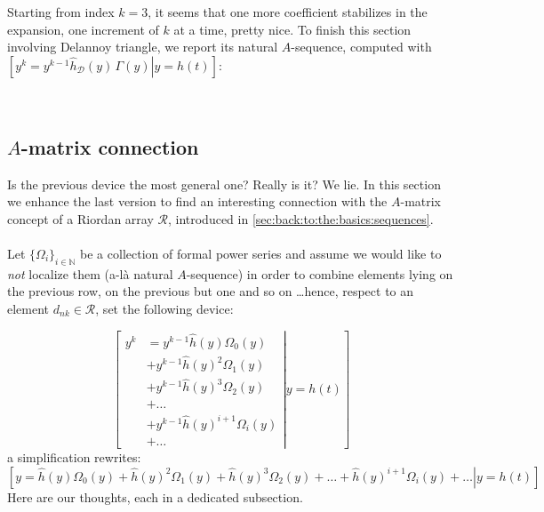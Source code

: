 {    Starting from index $k=3$, it seems that one more coefficient stabilizes
    in the expansion, one increment of $k$ at a time, pretty nice.
    To finish this section involving Delannoy triangle, we report its natural
    $A$-sequence, computed with $\left.\left[y^{k} = y^{k-1}
    \hat{h}_{\mathcal{D}}(y)\,\Gamma(y) \right| y = h(t) \right]$:

    \begin{lenghtydisplaymath}
        \left[\Gamma(y)=
        1 + 2 y -2\,y^{2} + 6 y^{3} -22\,y^{4} + 90 y^{5} -394\,y^{6} + 1806 y^{7}  + \mathcal{O}\left(y^{8}\right)
            \big| y = h(t) \right]\\
    \end{lenghtydisplaymath}
}

\subsection{$A$-matrix connection}

Is the previous device the most general one? Really is it? 
We lie. In this section we enhance the last version to 
find an interesting connection with 
the $A$-matrix concept of a Riordan array $\mathcal{R}$, 
introduced in \autoref{sec:back:to:the:basics:sequences}.
\\\\
Let $\lbrace\Omega_{i}\rbrace_{i\in\mathbb{N}}$ be a collection of formal
power series and assume we would like to \emph{not} localize them (a-l\`a natural 
$A$-sequence) in order to combine elements lying on the previous row, on the previous
but one and so on \ldots hence, respect to an element $d_{nk}\in\mathcal{R}$,
set the following device:

\begin{displaymath}
    \left.\left[
            \begin{split}
                y^{k} &= y^{k-1}\hat{h}(y) \Omega_{0}(y) \\
                &+ y^{k-1}\hat{h}(y)^{2} \Omega_{1}(y) \\
                &+ y^{k-1}\hat{h}(y)^{3} \Omega_{2}(y) \\
                &+ \ldots\\ 
                &+ y^{k-1}\hat{h}(y)^{i+1} \Omega_{i}(y)\\
                &+ \ldots
            \end{split}
        \right| y = h(t) \right]
\end{displaymath}
a simplification rewrites:
\begin{displaymath}
    \left.\left[
        y = \hat{h}(y) \Omega_{0}(y) + 
        \hat{h}(y)^{2} \Omega_{1}(y) + \hat{h}(y)^{3} \Omega_{2}(y) +
        \ldots +
        \hat{h}(y)^{i+1} \Omega_{i}(y) + \ldots
        \right| y = h(t) \right]
\end{displaymath}
Here are our thoughts, each in a dedicated subsection.

